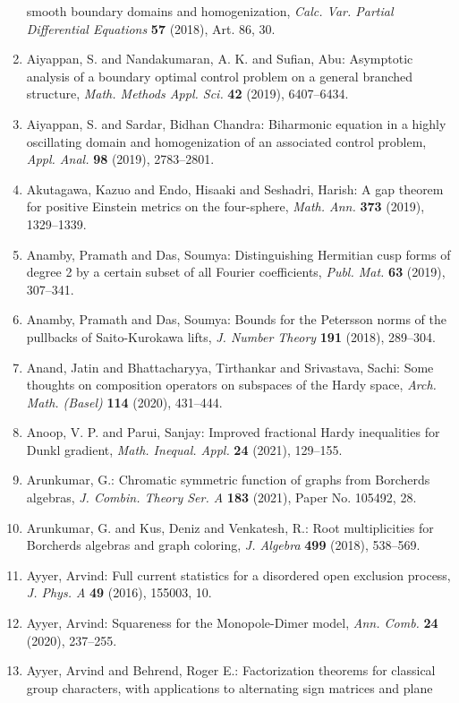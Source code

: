 \begin{enumerate}
smooth boundary domains and homogenization, \emph{Calc. Var. Partial Differential Equations} {\bf 57} (2018), Art. 86, 30.
\item Aiyappan, S. and Nandakumaran, A. K. and Sufian, Abu: Asymptotic analysis of a boundary optimal control problem on a
general branched structure, \emph{Math. Methods Appl. Sci.} {\bf 42} (2019), 6407--6434.
\item Aiyappan, S. and Sardar, Bidhan Chandra: Biharmonic equation in a highly oscillating domain and
homogenization of an associated control problem, \emph{Appl. Anal.} {\bf 98} (2019), 2783--2801.
\item Akutagawa, Kazuo and Endo, Hisaaki and Seshadri, Harish: A gap theorem for positive {E}instein metrics on the
four-sphere, \emph{Math. Ann.} {\bf 373} (2019), 1329--1339.
\item Anamby, Pramath and Das, Soumya: Distinguishing {H}ermitian cusp forms of degree 2 by a certain
subset of all {F}ourier coefficients, \emph{Publ. Mat.} {\bf 63} (2019), 307--341.
\item Anamby, Pramath and Das, Soumya: Bounds for the {P}etersson norms of the pullbacks of
{S}aito-{K}urokawa lifts, \emph{J. Number Theory} {\bf 191} (2018), 289--304.
\item Anand, Jatin and Bhattacharyya, Tirthankar and Srivastava,
Sachi: Some thoughts on composition operators on subspaces of the
{H}ardy space, \emph{Arch. Math. (Basel)} {\bf 114} (2020), 431--444.
\item Anoop, V. P. and Parui, Sanjay: Improved fractional {H}ardy inequalities for {D}unkl gradient, \emph{Math. Inequal. Appl.} {\bf 24} (2021), 129--155.
\item Arunkumar, G.: Chromatic symmetric function of graphs from {B}orcherds
algebras, \emph{J. Combin. Theory Ser. A} {\bf 183} (2021), Paper No. 105492, 28.
\item Arunkumar, G. and Kus, Deniz and Venkatesh, R.: Root multiplicities for {B}orcherds algebras and graph
coloring, \emph{J. Algebra} {\bf 499} (2018), 538--569.
\item Ayyer, Arvind: Full current statistics for a disordered open exclusion
process, \emph{J. Phys. A} {\bf 49} (2016), 155003, 10.
\item Ayyer, Arvind: Squareness for the {M}onopole-{D}imer model, \emph{Ann. Comb.} {\bf 24} (2020), 237--255.
\item Ayyer, Arvind and Behrend, Roger E.: Factorization theorems for classical group characters, with
applications to alternating sign matrices and plane

\end{enumerate}
